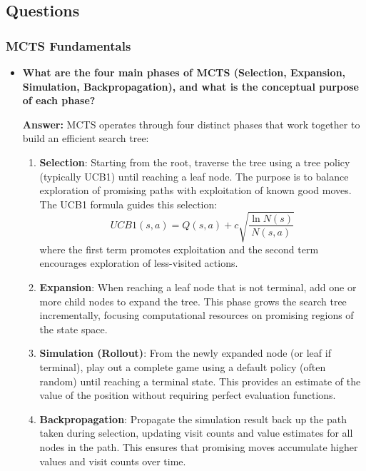 \subsection{Questions}

\subsubsection{MCTS Fundamentals}
\begin{itemize}
    \item \textbf{What are the four main phases of MCTS (Selection, Expansion, Simulation, Backpropagation), and what is the conceptual purpose of each phase?}
    
    \textbf{Answer:} MCTS operates through four distinct phases that work together to build an efficient search tree:
    
    \begin{enumerate}
        \item \textbf{Selection}: Starting from the root, traverse the tree using a tree policy (typically UCB1) until reaching a leaf node. The purpose is to balance exploration of promising paths with exploitation of known good moves. The UCB1 formula guides this selection:
        \[UCB1(s,a) = Q(s,a) + c\sqrt{\frac{\ln N(s)}{N(s,a)}}\]
        where the first term promotes exploitation and the second term encourages exploration of less-visited actions.
        
        \item \textbf{Expansion}: When reaching a leaf node that is not terminal, add one or more child nodes to expand the tree. This phase grows the search tree incrementally, focusing computational resources on promising regions of the state space.
        
        \item \textbf{Simulation (Rollout)}: From the newly expanded node (or leaf if terminal), play out a complete game using a default policy (often random) until reaching a terminal state. This provides an estimate of the value of the position without requiring perfect evaluation functions.
        
        \item \textbf{Backpropagation}: Propagate the simulation result back up the path taken during selection, updating visit counts and value estimates for all nodes in the path. This ensures that promising moves accumulate higher values and visit counts over time.
    \end{enumerate}
    

\end{itemize}
